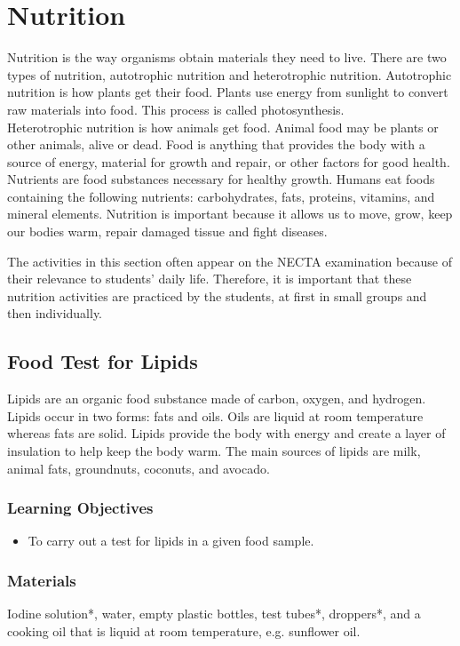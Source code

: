 \section{Nutrition}
Nutrition is the way organisms obtain materials they need to live. There are two types of nutrition, autotrophic nutrition and heterotrophic nutrition. Autotrophic nutrition is how plants get their food. Plants use energy from sunlight to convert raw materials into food. This process is called photosynthesis. \\Heterotrophic nutrition is how animals get food. Animal food may be plants or other animals, alive or dead. Food is anything that provides the body with a source of energy, material for growth and repair, or other factors for good health. Nutrients are food substances necessary for healthy growth. Humans eat foods containing the following nutrients: carbohydrates, fats, proteins, vitamins, and mineral elements. Nutrition is important because it allows us to move, grow, keep our bodies warm, repair damaged tissue and fight diseases.

The activities in this section often appear on the NECTA examination because of their relevance to students' daily life. Therefore, it is important that these nutrition activities are practiced by the students, at first in small groups and then individually.

\subsection{Food Test for Lipids}
Lipids are an organic food substance made of carbon, oxygen, and hydrogen. Lipids occur in two forms: fats and oils. Oils are liquid at room temperature whereas fats are solid. Lipids provide the body with energy and create a layer of insulation to help keep the body warm. The main sources of lipids are milk, animal fats, groundnuts, coconuts, and avocado.

\subsubsection*{Learning Objectives}
\begin{itemize}
\item{To carry out a test for lipids in a given food sample.}
\end{itemize}

\subsubsection*{Materials}
Iodine solution*, water, empty plastic bottles, test tubes*, droppers*, and a cooking oil that is liquid at room temperature, e.g. sunflower oil.

